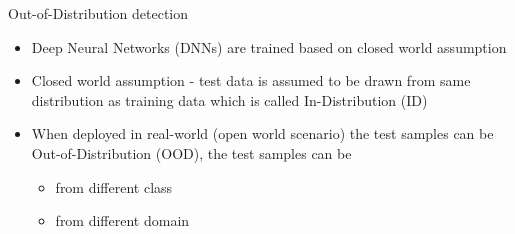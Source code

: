 \documentclass[aspectratio=169]{beamer}
\begin{document}
\begin{frame}{Out-of-Distribution detection}
    \begin{itemize}
        \item Deep Neural Networks (DNNs) are trained based on closed world assumption
        \item Closed world assumption - test data is assumed to be drawn from same distribution as training data which is called In-Distribution (ID)
        \item When deployed in real-world (open world scenario) the test samples can be Out-of-Distribution (OOD), the test samples can be
        \begin{itemize}
            \item from different class
            \item from different domain 
        \end{itemize}
    \end{itemize}
\end{frame}
\end{document}
